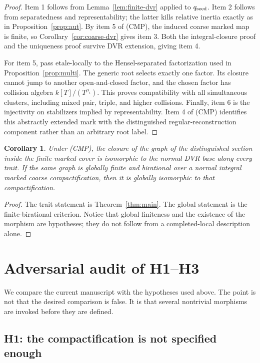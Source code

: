 \documentclass[11pt]{article}
\newtheorem{corollary}[theorem]{Corollary}
\begin{document}
\begin{proof}
Item 1 follows from Lemma~\ref{lem:finite-dvr} applied to
$q_{\rm seed}$.  Item 2 follows from separatedness and representability; the
latter kills relative inertia exactly as in Proposition~\ref{prop:aut}.
By item 5 of (CMP), the induced coarse marked map is finite, so
Corollary~\ref{cor:coarse-dvr} gives item 3.  Both the integral-closure proof
and the uniqueness proof survive DVR extension, giving item 4.

For item 5, pass etale-locally to the Hensel-separated factorization used in
Proposition~\ref{prop:multi}.  The generic root selects exactly one factor.
Its closure cannot jump to another open-and-closed factor, and the chosen
factor has collision algebra $k[T]/(T^{\mu_i})$.  This proves compatibility
with all simultaneous clusters, including mixed pair, triple, and higher
collisions.  Finally, item 6 is the injectivity on stabilizers implied by
representability.  Item 4 of (CMP) identifies this abstractly extended mark
with the distinguished regular-reconstruction component rather than an
arbitrary root label.
\end{proof}

\begin{corollary}
Under \textup{(CMP)}, the closure of the graph of the distinguished section
inside the finite marked cover is isomorphic to the normal DVR base along
every trait.  If the same graph is globally finite and birational over a
normal integral marked coarse compactification, then it is globally
isomorphic to that compactification.
\end{corollary}

\begin{proof}
The trait statement is Theorem~\ref{thm:main}.  The global statement is the
finite-birational criterion.  Notice that global finiteness and the existence
of the morphism are hypotheses; they do not follow from a completed-local
description alone.
\end{proof}

\section{Adversarial audit of H1--H3}\label{sec:audit}

We compare the current manuscript with the hypotheses used above.  The point
is not that the desired comparison is false.  It is that several nontrivial
morphisms are invoked before they are defined.

\subsection{H1: the compactification is not specified enough}
\end{document}
